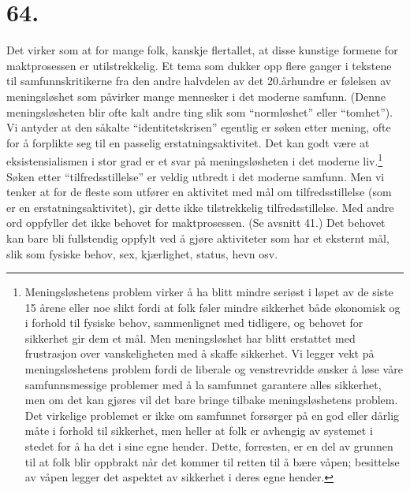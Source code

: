 \documentclass[oneside]{book}
\begin{document}
\section*{64.}
Det virker som at for mange folk, kanskje flertallet, at disse kunstige formene
for maktprosessen er utilstrekkelig. Et tema som dukker opp flere ganger i
tekstene til samfunnskritikerne fra den andre halvdelen av det 20.århundre er
følelsen av meningsløshet som påvirker mange mennesker i det moderne samfunn.
(Denne meningsløsheten blir ofte kalt andre ting slik som ``normløshet'' eller
``tomhet''). Vi antyder at den såkalte ``identitetskrisen'' egentlig er søken
etter mening, ofte for å forplikte seg til en passelig erstatningsaktivitet. Det
kan godt være at eksistensialismen i stor grad er et svar på meningsløsheten i
det moderne liv.\footnote{Meningsløshetens problem virker å ha blitt mindre
seriøst i løpet av de siste 15 årene eller noe slikt fordi at folk føler mindre
sikkerhet både økonomisk og i forhold til fysiske behov, sammenlignet med
tidligere, og behovet for sikkerhet gir dem et mål. Men meningsløshet har blitt
erstattet med frustrasjon over vanskeligheten med å skaffe sikkerhet. Vi legger
vekt på meningsløshetens problem fordi de liberale og venstrevridde ønsker å
løse våre samfunnsmessige problemer med å la samfunnet garantere alles
sikkerhet, men om det kan gjøres vil det bare bringe tilbake meningsløshetens
problem. Det virkelige problemet er ikke om samfunnet forsørger på en god eller
dårlig måte i forhold til sikkerhet, men heller at folk er avhengig av systemet
i stedet for å ha det i sine egne hender. Dette, forresten, er en del av grunnen
til at folk blir oppbrakt når det kommer til retten til å bære våpen; besittelse
av våpen legger det aspektet av sikkerhet i deres egne hender.} Søken etter
``tilfredsstillelse'' er veldig utbredt i det moderne samfunn. Men vi tenker at for de
fleste som utfører en aktivitet med mål om tilfredsstillelse (som er en
erstatningsaktivitet), gir dette ikke tilstrekkelig tilfredsstillelse. Med andre
ord oppfyller det ikke behovet for maktprosessen. (Se avsnitt 41.) Det
behovet kan bare bli fullstendig oppfylt ved å gjøre aktiviteter som har
et eksternt mål, slik som fysiske behov, sex, kjærlighet, status, hevn osv.
\end{document}
